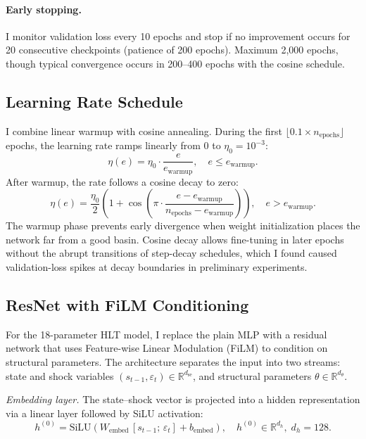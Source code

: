 \documentclass[12pt]{article}
\theoremstyle{plain}
\theoremstyle{definition}
\theoremstyle{remark}
\newcommand{\R}{\mathbb{R}}
\begin{document}
\paragraph{Early stopping.} I monitor validation loss every 10 epochs and stop if no improvement occurs for 20 consecutive checkpoints (patience of 200 epochs). Maximum 2,000 epochs, though typical convergence occurs in 200--400 epochs with the cosine schedule.


\subsection{Learning Rate Schedule}

I combine linear warmup with cosine annealing. During the first $\lfloor 0.1 \times n_{\text{epochs}} \rfloor$ epochs, the learning rate ramps linearly from 0 to $\eta_0 = 10^{-3}$:
\begin{equation}
\eta(e) = \eta_0 \cdot \frac{e}{e_{\text{warmup}}}, \quad e \leq e_{\text{warmup}}.
\end{equation}
After warmup, the rate follows a cosine decay to zero:
\begin{equation}
\eta(e) = \frac{\eta_0}{2}\!\left(1 + \cos\!\left(\pi \cdot \frac{e - e_{\text{warmup}}}{n_{\text{epochs}} - e_{\text{warmup}}}\right)\right), \quad e > e_{\text{warmup}}.
\end{equation}
The warmup phase prevents early divergence when weight initialization places the network far from a good basin. Cosine decay allows fine-tuning in later epochs without the abrupt transitions of step-decay schedules, which I found caused validation-loss spikes at decay boundaries in preliminary experiments.


\subsection{ResNet with FiLM Conditioning}
\label{app:resnet_film}

For the 18-parameter HLT model, I replace the plain MLP with a residual network that uses Feature-wise Linear Modulation (FiLM) to condition on structural parameters. The architecture separates the input into two streams: state and shock variables $(s_{t-1}, \varepsilon_t) \in \R^{d_{\text{se}}}$, and structural parameters $\theta \in \R^{d_\theta}$.

\textit{Embedding layer.} The state--shock vector is projected into a hidden representation via a linear layer followed by SiLU activation:
\begin{equation}
h^{(0)} = \text{SiLU}(W_{\text{embed}}\, [s_{t-1};\, \varepsilon_t] + b_{\text{embed}}), \quad h^{(0)} \in \R^{d_h},\; d_h = 128.
\end{equation}
\end{document}

